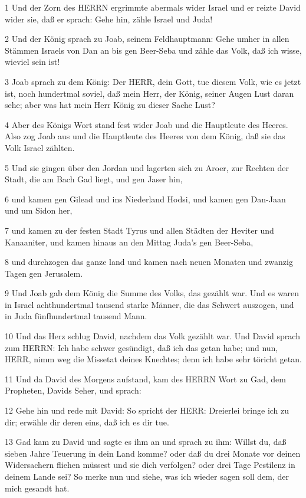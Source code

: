\par 1 Und der Zorn des HERRN ergrimmte abermals wider Israel und er reizte David wider sie, daß er sprach: Gehe hin, zähle Israel und Juda!
\par 2 Und der König sprach zu Joab, seinem Feldhauptmann: Gehe umher in allen Stämmen Israels von Dan an bis gen Beer-Seba und zähle das Volk, daß ich wisse, wieviel sein ist!
\par 3 Joab sprach zu dem König: Der HERR, dein Gott, tue diesem Volk, wie es jetzt ist, noch hundertmal soviel, daß mein Herr, der König, seiner Augen Lust daran sehe; aber was hat mein Herr König zu dieser Sache Lust?
\par 4 Aber des Königs Wort stand fest wider Joab und die Hauptleute des Heeres. Also zog Joab aus und die Hauptleute des Heeres von dem König, daß sie das Volk Israel zählten.
\par 5 Und sie gingen über den Jordan und lagerten sich zu Aroer, zur Rechten der Stadt, die am Bach Gad liegt, und gen Jaser hin,
\par 6 und kamen gen Gilead und ins Niederland Hodsi, und kamen gen Dan-Jaan und um Sidon her,
\par 7 und kamen zu der festen Stadt Tyrus und allen Städten der Heviter und Kanaaniter, und kamen hinaus an den Mittag Juda's gen Beer-Seba,
\par 8 und durchzogen das ganze land und kamen nach neuen Monaten und zwanzig Tagen gen Jerusalem.
\par 9 Und Joab gab dem König die Summe des Volks, das gezählt war. Und es waren in Israel achthundertmal tausend starke Männer, die das Schwert auszogen, und in Juda fünfhundertmal tausend Mann.
\par 10 Und das Herz schlug David, nachdem das Volk gezählt war. Und David sprach zum HERRN: Ich habe schwer gesündigt, daß ich das getan habe; und nun, HERR, nimm weg die Missetat deines Knechtes; denn ich habe sehr töricht getan.
\par 11 Und da David des Morgens aufstand, kam des HERRN Wort zu Gad, dem Propheten, Davids Seher, und sprach:
\par 12 Gehe hin und rede mit David: So spricht der HERR: Dreierlei bringe ich zu dir; erwähle dir deren eins, daß ich es dir tue.
\par 13 Gad kam zu David und sagte es ihm an und sprach zu ihm: Willst du, daß sieben Jahre Teuerung in dein Land komme? oder daß du drei Monate vor deinen Widersachern fliehen müssest und sie dich verfolgen? oder drei Tage Pestilenz in deinem Lande sei? So merke nun und siehe, was ich wieder sagen soll dem, der mich gesandt hat.
